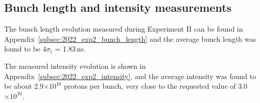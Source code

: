 

\subsection{Bunch length and intensity measurements}\label{subsec:bunch_length_intensity_exp2}

The bunch length evolution measured during Experiment II can be found in Appendix~\ref{subsec:2022_exp2_bunch_length} and the average bunch length was found to be $4\sigma_t$ = 1.83\,ns.

The measured intensity evolution is shown in Appendix~\ref{subsec:2022_exp2_intensity}, and the average intensity was found to be about 2.9$\times 10^{10}$ protons per bunch, very close to the requested value of 3.0$\times 10^{10}$.






